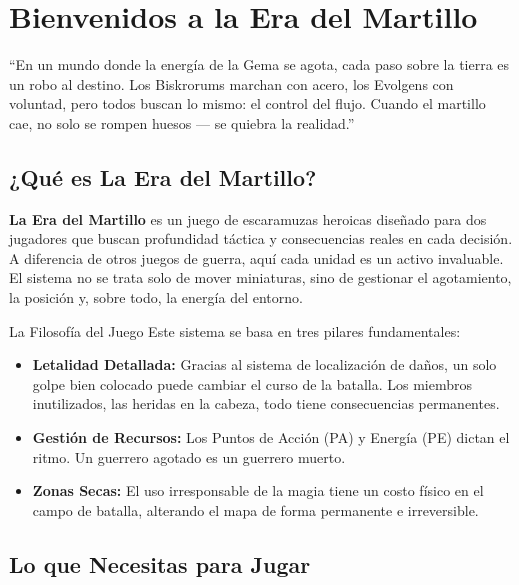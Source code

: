 
\chapter{Bienvenidos a la Era del Martillo}

\begin{loreblock}
``En un mundo donde la energía de la Gema se agota, cada paso sobre la tierra es un robo al destino. Los Biskrorums marchan con acero, los Evolgens con voluntad, pero todos buscan lo mismo: el control del flujo. Cuando el martillo cae, no solo se rompen huesos — se quiebra la realidad.''
\end{loreblock}

\vspace{0.4cm}

\section{¿Qué es La Era del Martillo?}

\textbf{La Era del Martillo} es un juego de escaramuzas heroicas diseñado para dos jugadores que buscan profundidad táctica y consecuencias reales en cada decisión. A diferencia de otros juegos de guerra, aquí cada unidad es un activo invaluable. El sistema no se trata solo de mover miniaturas, sino de gestionar el agotamiento, la posición y, sobre todo, la energía del entorno.

\begin{reglaespecial}{La Filosofía del Juego}
Este sistema se basa en tres pilares fundamentales:
\begin{itemize}
    \item \textbf{Letalidad Detallada:} Gracias al sistema de localización de daños, un solo golpe bien colocado puede cambiar el curso de la batalla. Los miembros inutilizados, las heridas en la cabeza, todo tiene consecuencias permanentes.
    \item \textbf{Gestión de Recursos:} Los Puntos de Acción (PA) y Energía (PE) dictan el ritmo. Un guerrero agotado es un guerrero muerto.
    \item \textbf{Zonas Secas:} El uso irresponsable de la magia tiene un costo físico en el campo de batalla, alterando el mapa de forma permanente e irreversible.
\end{itemize}
\end{reglaespecial}

\section{Lo que Necesitas para Jugar}

